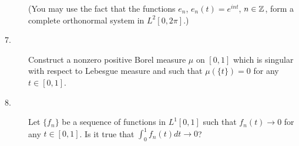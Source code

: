 \documentclass{article}
\begin{document}
\begin{description}
(You may use the fact that the functions $e_n$, $e_n(t) = e^{int}$,
$n \in \Bbb Z$, form a complete orthonormal system in $L^2[0,2\pi]$.)

\item[7.]
Construct a nonzero positive Borel measure $\mu$ on $[0,1]$ which is singular
with respect to Lebesgue measure and such that $\mu (\{t\}) = 0$
for any $t \in [0,1]$.

\item[8.]
Let $\{f_n\}$ be a sequence of functions in $L^1[0,1]$ such that
$f_n(t) \to 0$ for any $t \in [0,1]$. Is it true that
$\int_0^1 f_n(t) dt \to 0$?





\end{description}    
\end{document}
